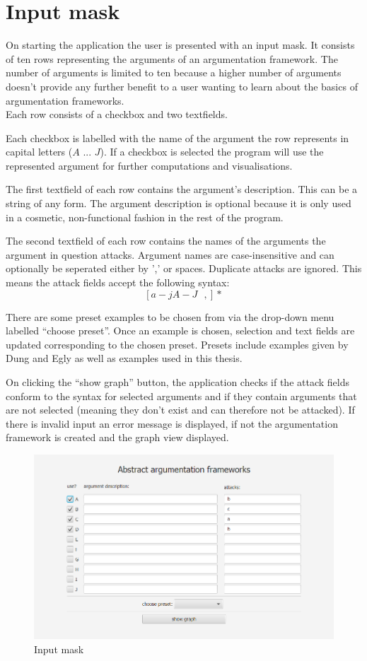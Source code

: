 \documentclass[draft,final]{vutinfth} %
\newcommand{\hl}{\par\vspace{6pt}} %
\begin{document}
\section{Input mask}
On starting the application the user is presented with an input mask. It consists of ten rows representing the arguments of an argumentation framework. The number of arguments is limited to ten because a higher number of arguments doesn't provide any further benefit to a user wanting to learn about the basics of argumentation frameworks.\\
Each row consists of a checkbox and two textfields.\hl
Each checkbox is labelled with the name of the argument the row represents in capital letters ($A$ ... $J$). If a checkbox is selected the program will use the represented argument for further computations and visualisations.\hl
The first textfield of each row contains the argument's description. This can be a string of any form. The argument description is optional because it is only used in a cosmetic, non-functional fashion in the rest of the program.\hl
The second textfield of each row contains the names of the arguments the argument in question attacks. Argument names are case-insensitive and can optionally be seperated either by ',' or spaces. Duplicate attacks are ignored. This means the attack fields accept the following syntax: \[[a-jA-J\text{ },]*\]\hl %

There are some preset examples to be chosen from via the drop-down menu labelled ``choose preset''. Once an example is chosen, selection and text fields are updated corresponding to the chosen preset. Presets include examples given by Dung \cite{Dung} and Egly \cite{Egly} as well as examples used in this thesis.\hl
On clicking the ``show graph'' button, the application checks if the attack fields conform to the syntax for selected arguments and if they contain arguments that are not selected (meaning they don't exist and can therefore not be attacked). If there is invalid input an error message is displayed, if not the argumentation framework is created and the graph view displayed.\hl

\FloatBarrier
	\begin{figure}[!ht]
		\centering
		\includegraphics[width=\linewidth]{pics/input.png}
		\caption{Input mask}
	\end{figure}
\FloatBarrier
\end{document}
